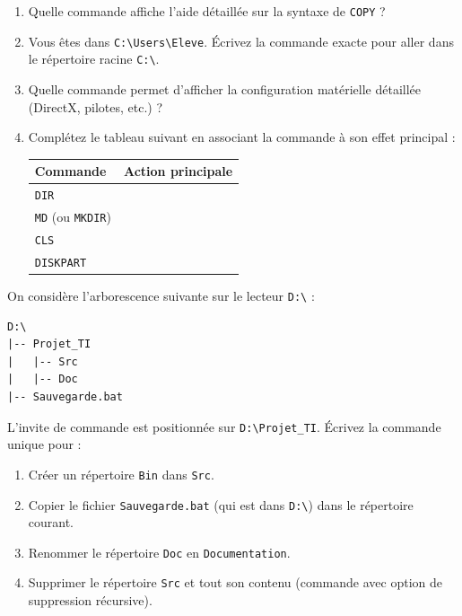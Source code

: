 \documentclass[11pt]{article}
\begin{document}
\begin{exercice}
\begin{enumerate}
    \item Quelle commande affiche l'aide détaillée sur la syntaxe de \texttt{COPY} ?
    \item Vous êtes dans \texttt{C:\textbackslash Users\textbackslash Eleve}. Écrivez la commande exacte pour aller dans le répertoire racine \texttt{C:\textbackslash}.
    \item Quelle commande permet d'afficher la configuration matérielle détaillée (DirectX, pilotes, etc.) ?
    \item Complétez le tableau suivant en associant la commande à son effet principal :
    \begin{tabular}{|l|l|}
    \hline
    \textbf{Commande} & \textbf{Action principale} \\ \hline
    \texttt{DIR} & \\ \hline
    \texttt{MD} (ou \texttt{MKDIR}) & \\ \hline
    \texttt{CLS} & \\ \hline
    \texttt{DISKPART} & \\ \hline
    \end{tabular}
\end{enumerate}
\end{exercice}

\begin{exercice}
On considère l'arborescence suivante sur le lecteur \texttt{D:\textbackslash} :
\begin{verbatim}
D:\
|-- Projet_TI
|   |-- Src
|   |-- Doc
|-- Sauvegarde.bat
\end{verbatim}
L'invite de commande est positionnée sur \texttt{D:\textbackslash Projet\_TI}. Écrivez la commande unique pour :
\begin{enumerate}
    \item Créer un répertoire \texttt{Bin} dans \texttt{Src}.
    \item Copier le fichier \texttt{Sauvegarde.bat} (qui est dans \texttt{D:\textbackslash}) dans le répertoire courant.
    \item Renommer le répertoire \texttt{Doc} en \texttt{Documentation}.
    \item Supprimer le répertoire \texttt{Src} et tout son contenu (commande avec option de suppression récursive).
\end{enumerate}
\end{exercice}
\end{document}
